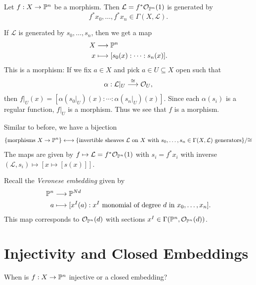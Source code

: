 \begin{example}
  Let $f : X \to \mathbb{P}^n$ be a morphism.
  Then $\mathcal{L} = f^* \mathcal{O}_{\mathbb{P}^n}(1)$
  is generated by
  \[f^* x_0, \dots, f^* x_n \in \Gamma(X, \mathcal{L}).\]
\end{example}

\begin{remark}
  If $\mathcal{L}$ is generated by
  $s_0, \dots, s_n$, then we get a map
  \begin{align*}
    X &\longrightarrow \mathbb{P}^n \\
    x &\longmapsto [s_0(x) : \cdots : s_n(x)].
  \end{align*}
  This is a morphism: If we fix $a \in X$ 
  and pick $a \in U \subseteq X$ open such
  that
  \[
    \alpha : \mathcal{L}|_U \overset{\cong}{\longrightarrow} \mathcal{O}_U,
  \]
  then $f|_U(x) = [\alpha(s_0|_U)(x) : \cdots : \alpha(s_n|_U)(x)]$.
  Since each
  $\alpha(s_i)$ is a regular function,
  $f|_U$ is a morphism.
  Thus we see that $f$ is a morphism.
\end{remark}

\begin{remark}
  Similar to before, we have a bijection
  \[
    \{\text{morphisms } X \to \mathbb{P}^n\}
    \longleftrightarrow
    \{\text{invertible sheaves $\mathcal{L}$ on $X$ with } s_0, \dots, s_n \in \Gamma(X, \mathcal{L}) \text{ generators}\} / {\cong}
  \]
  The maps are given by
  $f \mapsto \mathcal{L} = f^* \mathcal{O}_{\mathbb{P}^n}(1)$
  with $s_i = f^* x_i$ with
  inverse $(\mathcal{L}, s_i) \mapsto [x \mapsto [s(x)]]$.
\end{remark}

\begin{example}
  Recall the \emph{Veronese embedding}
  given by
  \begin{align*}
    \mathbb{P}^n &\longrightarrow \mathbb{P}^{Nd} \\
    a &\longmapsto [x^I(a) : x^I \text{ monomial of degree $d$ in $x_0, \dots, x_n$}].
  \end{align*}
  This map corresponds to
  $\mathcal{O}_{\mathbb{P}^n}(d)$ with sections
  $x^I \in \Gamma(\mathbb{P}^n, \mathcal{O}_{\mathbb{P}^n}(d))$.
\end{example}

\section{Injectivity and Closed Embeddings}

\begin{remark}
  When is $f : X \to \mathbb{P}^n$ injective or a
  closed embedding?
\end{remark}


